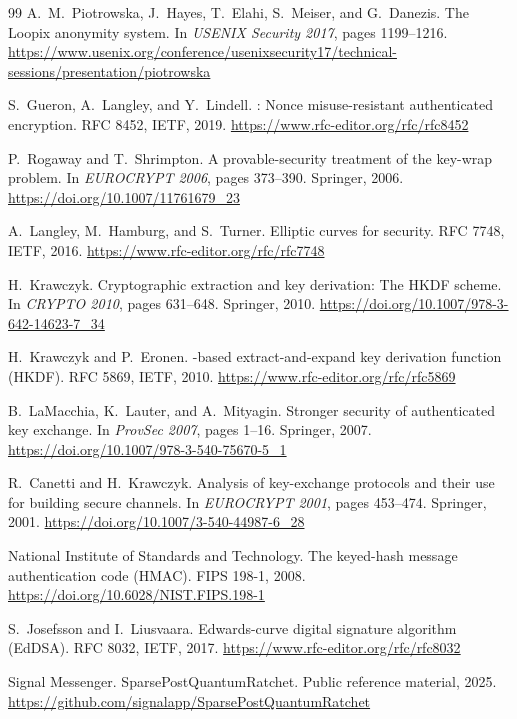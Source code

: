 \documentclass[preprint,12pt]{elsarticle}
\theoremstyle{definition}
\begin{document}
\begin{thebibliography}{99}
A.~M.~Piotrowska, J.~Hayes, T.~Elahi, S.~Meiser, and G.~Danezis.
\newblock The Loopix anonymity system.
\newblock In \emph{USENIX Security 2017}, pages 1199--1216.
\newblock \url{https://www.usenix.org/conference/usenixsecurity17/technical-sessions/presentation/piotrowska}

S.~Gueron, A.~Langley, and Y.~Lindell.
: Nonce misuse-resistant authenticated encryption.
\newblock RFC 8452, IETF, 2019.
\newblock \url{https://www.rfc-editor.org/rfc/rfc8452}

P.~Rogaway and T.~Shrimpton.
\newblock A provable-security treatment of the key-wrap problem.
\newblock In \emph{EUROCRYPT 2006}, pages 373--390. Springer, 2006.
\newblock \url{https://doi.org/10.1007/11761679_23}

A.~Langley, M.~Hamburg, and S.~Turner.
\newblock Elliptic curves for security.
\newblock RFC 7748, IETF, 2016.
\newblock \url{https://www.rfc-editor.org/rfc/rfc7748}

H.~Krawczyk.
\newblock Cryptographic extraction and key derivation: The {HKDF} scheme.
\newblock In \emph{CRYPTO 2010}, pages 631--648. Springer, 2010.
\newblock \url{https://doi.org/10.1007/978-3-642-14623-7_34}

H.~Krawczyk and P.~Eronen.
-based extract-and-expand key derivation function ({HKDF}).
\newblock RFC 5869, IETF, 2010.
\newblock \url{https://www.rfc-editor.org/rfc/rfc5869}

B.~LaMacchia, K.~Lauter, and A.~Mityagin.
\newblock Stronger security of authenticated key exchange.
\newblock In \emph{ProvSec 2007}, pages 1--16. Springer, 2007.
\newblock \url{https://doi.org/10.1007/978-3-540-75670-5_1}

R.~Canetti and H.~Krawczyk.
\newblock Analysis of key-exchange protocols and their use for building secure channels.
\newblock In \emph{EUROCRYPT 2001}, pages 453--474. Springer, 2001.
\newblock \url{https://doi.org/10.1007/3-540-44987-6_28}

National Institute of Standards and Technology.
\newblock The keyed-hash message authentication code ({HMAC}).
\newblock FIPS 198-1, 2008.
\newblock \url{https://doi.org/10.6028/NIST.FIPS.198-1}

S.~Josefsson and I.~Liusvaara.
\newblock Edwards-curve digital signature algorithm ({EdDSA}).
\newblock RFC 8032, IETF, 2017.
\newblock \url{https://www.rfc-editor.org/rfc/rfc8032}

Signal Messenger.
\newblock SparsePostQuantumRatchet.
\newblock Public reference material, 2025.
\newblock \url{https://github.com/signalapp/SparsePostQuantumRatchet}

\end{thebibliography}
\end{document}
